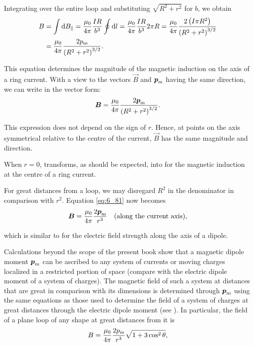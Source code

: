 \noindent
Integrating over the entire loop and substituting $\sqrt{R^2+r^2}$ for $b$, we obtain
\begin{align}
    B &= \int \mathrm{d} B_{\parallel} = \frac{\mu_0}{4\pi} \frac{I R}{b^3} \oint \mathrm{d} l = \frac{\mu_0}{4\pi} \frac{I R}{b^3} 2\pi R = \frac{\mu_0}{4\pi} \frac{2\left(I \pi R^2\right)}{\left(R^2+r^2\right)^{3/2}} \nonumber\\
    &= \frac{\mu_0}{4\pi} \frac{2 p_{\text{m}}}{\left(R^2+r^2\right)^{3/2}}. \label{eq:6_80}
\end{align}

\noindent
This equation determines the magnitude of the magnetic induction on the axis of a ring current. With a view to the vectors $\vec{B}$ and $\boldsymbol{p}_{\text{m}}$ having the same direction, we can write  in the vector form:
\begin{equation}\label{eq:6_81}
    \boldsymbol{B} = \frac{\mu_0}{4\pi} \frac{2 \boldsymbol{p}_{\text{m}}}{\left(R^2+r^2\right)^{3/2}}.
\end{equation}

\noindent
This expression does not depend on the sign of $r$. Hence, at points on the axis symmetrical relative to the centre of the current, $\vec{B}$ has the same magnitude and direction.

When $r=0$,  transforms, as should be expected, into  for the magnetic induction at the centre of a ring current.

For great distances from a loop, we may disregard $R^2$ in the denominator in comparison with $r^2$. Equation \eqref{eq:6_81} now becomes
\begin{equation}\label{eq:6_82}
    \boldsymbol{B} = \frac{\mu_0}{4\pi} \frac{2 \boldsymbol{p}_{\text{m}}}{r^3}\quad (\text{along the current axis}),
\end{equation}

\noindent
which is similar to  for the electric field strength along the axis of a dipole.

Calculations beyond the scope of the present book show that a magnetic dipole moment $\boldsymbol{p}_{\text{m}}$ can be ascribed to any system of currents or moving charges localized in a restricted portion of space (compare with the electric dipole moment of a system of charges). The magnetic field of such a system at distances that are great in comparison with its dimensions is determined through $\boldsymbol{p}_{\text{m}}$ using the same equations as those used to determine the field of a system of charges at great distances through the electric dipole moment (see ). In particular, the field of a plane loop of any shape at great distances from it is
\begin{equation}\label{eq:6_83}
    B = \frac{\mu_0}{4\pi} \frac{2 p_{\text{m}}}{r^3} \sqrt{1 + 3 \cos^2\theta},
\end{equation}

